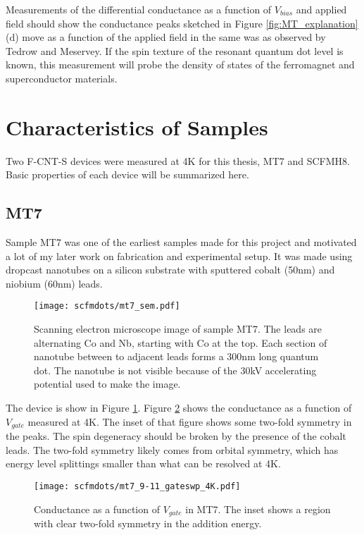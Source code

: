 Measurements of the differential conductance as a function of $V_{bias}$ and applied field should show the conductance peaks sketched in Figure \ref{fig:MT_explanation}(d) move as a function of the applied field in the same was as observed by Tedrow and Meservey. If the spin texture of the resonant quantum dot level is known, this measurement will probe the density of states of the ferromagnet and superconductor materials.

\section{Characteristics of Samples}

Two F-CNT-S devices were measured at 4K for this thesis, MT7 and SCFMH8. Basic properties of each device will be summarized here.

\subsection*{MT7}

Sample MT7 was one of the earliest samples made for this project and motivated a lot of my later work on fabrication and experimental setup. It was made using dropcast nanotubes on a silicon substrate with sputtered cobalt (50nm) and niobium (60nm) leads. 

\begin{figure}
    \centering
    \texttt{[image: scfmdots/mt7\_sem.pdf]}
    \caption{Scanning electron microscope image of sample MT7. The leads are alternating Co and Nb, starting with Co at the top. Each section of nanotube between to adjacent leads forms a 300nm long quantum dot. The nanotube is not visible because of the 30kV accelerating potential used to make the image.}
    \label{fig:mt7}
\end{figure}

The device is show in Figure \ref{fig:mt7}. Figure \ref{fig:mt7_gate} shows the conductance as a function of $V_{gate}$ measured at 4K. The inset of that figure shows some two-fold symmetry in the peaks. The spin degeneracy should be broken by the presence of the cobalt leads. The two-fold symmetry likely comes from orbital symmetry, which has energy level splittings smaller than what can be resolved at 4K.

\begin{figure}
    \centering
    \texttt{[image: scfmdots/mt7\_9-11\_gateswp\_4K.pdf]}
    \caption{Conductance as a function of $V_{gate}$ in MT7. The inset shows a region with clear two-fold symmetry in the addition energy.}
    \label{fig:mt7_gate}
\end{figure}


